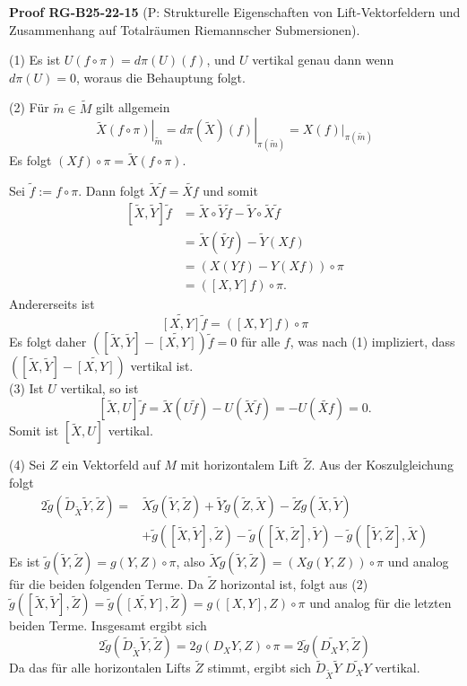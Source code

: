 \documentclass[10pt, letterpaper]{article}
\newcommand{\CustomHeading}[3]{%
  \par\medskip\noindent%
  \textbf{#1 #2} \textnormal{(#3)}.\enskip%
}
\newenvironment{PROOF}[2]{\begin{unitbox}\CustomHeading{Proof}{#1}{#2}}{\end{unitbox}}
\begin{document}
\begin{PROOF}{RG-B25-22-15}{P: Strukturelle Eigenschaften von Lift-Vektorfeldern und Zusammenhang auf Totalräumen Riemannscher Submersionen}
(1) Es ist $U(f \circ \pi)=d \pi(U)(f)$, und $U$ vertikal genau dann wenn $d \pi(U)=0$, woraus die Behauptung folgt.


(2) Für $\tilde{m} \in \tilde{M}$ gilt allgemein
$$
\left.\tilde{X}(f \circ \pi)\right|_{\tilde{m}}=\left.d \pi(\tilde{X})(f)\right|_{\pi(\tilde{m})}=\left.X(f)\right|_{\pi(\tilde{m})}
$$
Es folgt $(X f) \circ \pi=\tilde{X}(f \circ \pi)$.

Sei $\tilde{f}:=f \circ \pi$. Dann folgt $\tilde{X} \tilde{f}=\widetilde{X f}$ und somit
$$
\begin{aligned}
{[\tilde{X}, \tilde{Y}] \tilde{f} } & =\tilde{X} \circ \tilde{Y} \tilde{f}-\tilde{Y} \circ \tilde{X} \tilde{f} \\
& =\tilde{X}(\tilde{Y f})-\tilde{Y}(X f) \\
& =(X(Y f)-Y(X f)) \circ \pi \\
& =([X, Y] f) \circ \pi .
\end{aligned}
$$
Andererseits ist
$$
\widetilde{[X, Y]} \tilde{f}=([X, Y] f) \circ \pi
$$
Es folgt daher $([\tilde{X}, \tilde{Y}]-\widetilde{[X, Y]}) \tilde{f}=0$ für alle $f$, was nach (1) impliziert, dass $([\tilde{X}, \tilde{Y}]-\widetilde{[X, Y]})$ vertikal ist.\\


(3) Ist $U$ vertikal, so ist
$$
[\tilde{X}, U] \tilde{f}=\tilde{X}(U \tilde{f})-U(\tilde{X} \tilde{f})=-U(\widetilde{X f})=0 .
$$
Somit ist $[\tilde{X}, U]$ vertikal.


(4) Sei $Z$ ein Vektorfeld auf $M$ mit horizontalem Lift $\tilde{Z}$. Aus der Koszulgleichung folgt
$$
\begin{aligned}
2 \tilde{g}\left(\tilde{D}_{\tilde{X}} \tilde{Y}, \tilde{Z}\right)= & \tilde{X} \tilde{g}(\tilde{Y}, \tilde{Z})+\tilde{Y} \tilde{g}(\tilde{Z}, \tilde{X})-\tilde{Z} \tilde{g}(\tilde{X}, \tilde{Y}) \\
& +\tilde{g}([\tilde{X}, \tilde{Y}], \tilde{Z})-\tilde{g}([\tilde{X}, \tilde{Z}], \tilde{Y})-\tilde{g}([\tilde{Y}, \tilde{Z}], \tilde{X})
\end{aligned}
$$
Es ist $\tilde{g}(\tilde{Y}, \tilde{Z})=g(Y, Z) \circ \pi$, also $\tilde{X} \tilde{g}(\tilde{Y}, \tilde{Z})=(X g(Y, Z)) \circ \pi$ und analog für die beiden folgenden Terme. Da $\tilde{Z}$ horizontal ist, folgt aus (2) $\tilde{g}([\tilde{X}, \tilde{Y}], \tilde{Z})=\tilde{g}(\widetilde{[X, Y]}, \tilde{Z})=g([X, Y], Z) \circ \pi$ und analog für die letzten beiden Terme. Insgesamt ergibt sich
$$
2 \tilde{g}\left(\tilde{D}_{\tilde{X}} \tilde{Y}, \tilde{Z}\right)=2 g\left(D_{X} Y, Z\right) \circ \pi=2 \tilde{g}\left(\widetilde{D_{X} Y}, \tilde{Z}\right)
$$
Da das für alle horizontalen Lifts $\tilde{Z}$ stimmt, ergibt sich $\tilde{D}_{\tilde{X}} \tilde{Y}$ $\widetilde{D_{X} Y}$ vertikal.


\end{PROOF}
\end{document}
